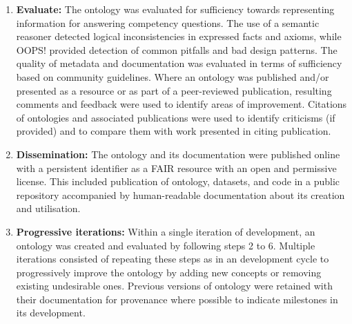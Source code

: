 \begin{enumerate}
    \item \textbf{Evaluate:} The ontology was evaluated for sufficiency towards representing information for answering competency questions. The use of a semantic reasoner detected logical inconsistencies in expressed facts and axioms, while OOPS! provided detection of common pitfalls and bad design patterns.
    The quality of metadata and documentation was evaluated in terms of sufficiency based on community guidelines. Where an ontology was published and/or presented as a resource or as part of a peer-reviewed publication, resulting comments and feedback were used to identify areas of improvement. Citations of ontologies and associated publications were used to identify criticisms (if provided) and to compare them with work presented in citing publication.
    \item \textbf{Dissemination:} The ontology and its documentation were published online with a persistent identifier as a FAIR resource with an open and permissive license. This included publication of ontology, datasets, and code in a public repository accompanied by human-readable documentation about its creation and utilisation.
    \item \textbf{Progressive iterations:} Within a single iteration of development, an ontology was created and evaluated by following steps 2 to 6. Multiple iterations consisted of repeating these steps as in an development cycle to progressively improve the ontology by adding new concepts or removing existing undesirable ones. Previous versions of ontology were retained with their documentation for provenance where possible to indicate milestones in its development.
\end{enumerate}


